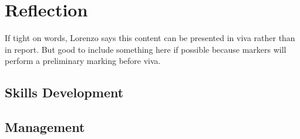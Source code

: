 \chapter{Reflection}
If tight on words, Lorenzo says this content can be presented in viva rather than in report. But good to include something here if possible because markers will perform a preliminary marking before viva.
\section{Skills Development}

\section{Management}
